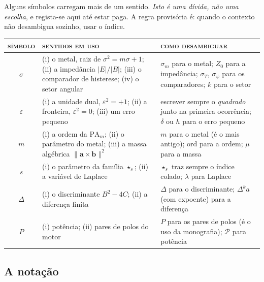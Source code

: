 Alguns símbolos carregam mais de um sentido. \emph{Isto é uma dívida, não uma escolha}, e
regista-se aqui até estar paga. A regra provisória é: quando o contexto não desambigua sozinho,
usar o índice.

\begin{center}\small
\renewcommand{\arraystretch}{1.2}
\begin{tabular}{@{}cp{5.0cm}p{6.4cm}@{}}
\toprule
\textsc{símbolo} & \textsc{sentidos em uso} & \textsc{como desambiguar} \\
\midrule
$\sigma$ & (i) o metal, raiz de $\sigma^2=m\sigma+1$; (ii) a impedância $|E|/|B|$;
          (iii) o comparador de histerese; (iv) o setor angular
        & $\sigma_m$ para o metal; $Z_0$ para a impedância; $\sigma_{T}$, $\sigma_\psi$ para os
          comparadores; $k$ para o setor \\
$\varepsilon$ & (i) a unidade dual, $\varepsilon^2=+1$; (ii) a fronteira, $\varepsilon^2=0$;
                (iii) um erro pequeno
        & escrever sempre o \emph{quadrado} junto na primeira ocorrência; $\delta$ ou $h$ para o
          erro pequeno \\
$m$ & (i) a ordem da $\mathrm{PA}_m$; (ii) o parâmetro do metal;
      (iii) a massa algébrica $\|\mathbf a\times\mathbf b\|^2$
        & $m$ para o metal (é o mais antigo); $\mathrm{ord}$ para a ordem; $\mu$ para a massa \\
$s$ & (i) o parâmetro da família $\star_s$; (ii) a variável de Laplace
        & $\star_s$ traz sempre o índice colado; $\lambda$ para Laplace \\
$\Delta$ & (i) o discriminante $B^2-4C$; (ii) a diferença finita
        & $\Delta$ para o discriminante; $\Delta^k a$ (com expoente) para a diferença \\
$P$ & (i) potência; (ii) pares de polos do motor
        & $P$ para os pares de polos (é o uso da monografia); $\mathcal P$ para potência \\
\bottomrule
\end{tabular}
\end{center}

\subsection{A notação}

